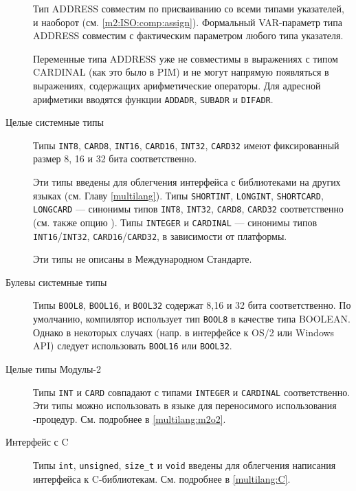 \begin{description}
Тип ADDRESS совместим по присваиванию со всеми типами указателей, и наоборот
(см. \ref{m2:ISO:comp:assign}). Формальный VAR-параметр типа 
ADDRESS совместим с фактическим параметром любого типа указателя.

Переменные типа ADDRESS уже не совместимы в выражениях с типом
CARDINAL (как это было в PIM) и не могут напрямую появляться
в выражениях, содержащих арифметические операторы.
Для адресной арифметики вводятся функции {\tt ADDADR}, 
{\tt SUBADR} и {\tt DIFADR}.

\item[Целые системные типы] \mbox{}   

        Типы {\tt INT8}, {\tt CARD8}, {\tt INT16}, {\tt CARD16},
        {\tt  INT32},  {\tt  CARD32} имеют фиксированный размер 8,
        16 и 32  бита соответственно.

Эти типы введены для облегчения интерфейса с библиотеками
на других языках (см. Главу \ref{multilang}).  
Типы  {\tt  SHORTINT}, {\tt LONGINT},
{\tt  SHORTCARD},  {\tt  LONGCARD} --- синонимы типов 
{\tt INT8},   {\tt   INT32},   {\tt   CARD8},   {\tt   CARD32}
соответственно (см.  также опцию  ).
Типы {\tt  INTEGER}  и {\tt CARDINAL} --- синонимы типов
{\tt   INT16}/{\tt  INT32},  {\tt  CARD16}/{\tt  CARD32},
в зависимости от платформы.

Эти типы не описаны в Международном Стандарте.

\item[Булевы системные типы] \mbox{}

Типы {\tt BOOL8}, {\tt BOOL16}, и {\tt BOOL32} 
содержат 8,16 и 32 бита соответственно. По умолчанию, компилятор
использует тип {\tt BOOL8} в качестве типа BOOLEAN.
Однако в некоторых случаях
(напр. в интерфейсе к OS/2 или Windows API) 
следует использовать {\tt BOOL16} или {\tt BOOL32}.

\item[Целые типы Модулы-2] \mbox{}

Типы {\tt INT} и {\tt CARD} совпадают с \mt{} типами {\tt INTEGER}
        и {\tt CARDINAL} соответственно. 
Эти типы можно использовать в языке
\ot{} для переносимого использования
\mt{}-процедур.
См. подробнее в \ref{multilang:m2o2}.

\item[Интерфейс с C] \mbox{}

Типы {\tt int},  {\tt unsigned}, \verb|size_t| и 
{\tt void} введены для облегчения написания интерфейса к
C-библиотекам. См. подробнее в \ref{multilang:C}.

\end{description}


